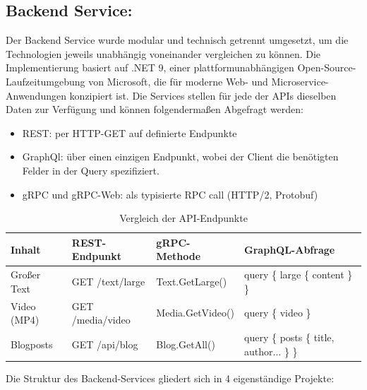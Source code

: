 \subsection{Backend Service:}

Der Backend Service wurde modular und technisch getrennt umgesetzt, um die Technologien jeweils unabhängig voneinander vergleichen zu können. Die Implementierung basiert auf .NET 9, einer plattformunabhängigen Open-Source-Laufzeitumgebung von Microsoft, die für moderne Web- und Microservice-Anwendungen konzipiert ist.
Die Services stellen für jede der APIs dieselben Daten zur Verfügung und können folgendermaßen Abgefragt werden:

\begin{itemize}
	\item REST: per HTTP-GET auf definierte Endpunkte
	\item GraphQl: über einen einzigen Endpunkt, wobei der Client die benötigten Felder in der Query spezifiziert.
	\item gRPC und gRPC-Web: als typisierte RPC call (HTTP/2, Protobuf) 
\end{itemize}

\begin{table}[h]
	\centering
	\caption{Vergleich der API-Endpunkte}
	\label{tab:api-comparison}
	\renewcommand{\arraystretch}{1.2}
	\setlength{\tabcolsep}{4pt}
	\small
	\begin{tabularx}{\textwidth}{|l|>{\ttfamily}l|>{\ttfamily}l|>{\ttfamily}X|}
		\hline
		\textbf{Inhalt} & \textbf{REST-Endpunkt} & \textbf{gRPC-Methode} & \textbf{GraphQL-Abfrage} \\
		\hline
		Großer Text & GET /text/large & Text.GetLarge() & query \{ large \{ content \} \} \\
		\hline
		Video (MP4) & GET /media/video & Media.GetVideo() & query \{ video \} \\
		\hline
		Blogposts & GET /api/blog & Blog.GetAll() & query \{ posts \{ title, author... \} \} \\
		\hline
	\end{tabularx}
\end{table}




Die Struktur des Backend-Services gliedert sich in 4 eigenständige Projekte:

